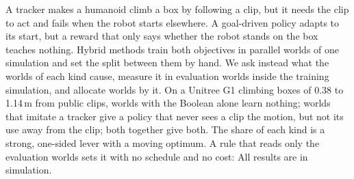 A tracker makes a humanoid climb a box by following a clip, but it needs the clip to act and fails when the robot starts elsewhere. A goal-driven policy adapts to its start, but a reward that only says whether the robot stands on the box teaches nothing. Hybrid methods train both objectives in parallel worlds of one simulation and set the split between them by hand. We ask instead what the worlds of each kind cause, measure it in evaluation worlds inside the training simulation, and allocate worlds by it. On a Unitree G1 climbing boxes of 0.38 to 1.14\,m from public clips, worlds with the Boolean alone learn nothing; worlds that imitate a tracker give a policy that never sees a clip the motion, but not its use away from the clip; both together give both. The share of each kind is a strong, one-sided lever with a moving optimum. A rule that reads only the evaluation worlds sets it with no schedule and no cost: \abstractSchedules{} \abstractAll{} All results are in simulation.
